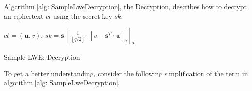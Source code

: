 Algorithm \ref{alg: SampleLweDecryption}, the Decryption, describes how to decrypt an ciphertext $ct$ using the secret key $sk$.



\begin{algorithm}[htb]
  \begin{algorithmic}[1]
    \REQUIRE $ct = (\textbf{u}, v)$, $sk = \textbf{s}$
    \RETURN $\left\lfloor \frac{1}{\left\lfloor q/2\right\rfloor}\cdot \left[v-\textbf{s}^T \cdot \textbf{u}\right]_q\right\rceil _2$
  \end{algorithmic}
  \caption{Sample LWE: Decryption}
  \label{alg: SampleLweDecryption}
\end{algorithm}


To get a better understanding, consider the following simplification of the term in algorithm \ref{alg: SampleLweDecryption}.


